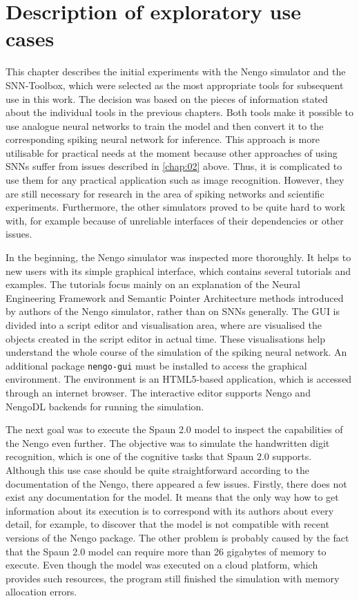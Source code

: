 \chapter{Description of exploratory use cases} \label{chap:05}

This chapter describes the initial experiments with the Nengo simulator and the SNN-Toolbox, which were selected as the most appropriate tools for subsequent use in this work. The decision was based on the pieces of information stated about the individual tools in the previous chapters. Both tools make it possible to use analogue neural networks to train the model and then convert it to the corresponding spiking neural network for inference. This approach is more utilisable for practical needs at the moment because other approaches of using SNNs suffer from issues described in \cref{chap:02} above. Thus, it is complicated to use them for any practical application such as image recognition. However, they are still necessary for research in the area of spiking networks and scientific experiments. Furthermore, the other simulators proved to be quite hard to work with, for example because of unreliable interfaces of their dependencies or other issues. \par
In the beginning, the Nengo simulator was inspected more thoroughly. It helps to new users with its simple graphical interface, which contains several tutorials and examples. The tutorials focus mainly on an explanation of the Neural Engineering Framework and Semantic Pointer Architecture methods introduced by authors of the Nengo simulator, rather than on SNNs generally. The GUI is divided into a script editor and visualisation area, where are visualised the objects created in the script editor in actual time. These visualisations help understand the whole course of the simulation of the spiking neural network. An additional package \texttt{nengo-gui} must be installed to access the graphical environment. The environment is an HTML5-based application, which is accessed through an internet browser. The interactive editor supports Nengo and NengoDL backends for running the simulation. \par
The next goal was to execute the Spaun 2.0 model to inspect the capabilities of the Nengo even further. The objective was to simulate the handwritten digit recognition, which is one of the cognitive tasks that Spaun 2.0 supports. Although this use case should be quite straightforward according to the documentation of the Nengo, there appeared a few issues. Firstly, there does not exist any documentation for the model. It means that the only way how to get information about its execution is to correspond with its authors about every detail, for example, to discover that the model is not compatible with recent versions of the Nengo package. The other problem is probably caused by the fact that the Spaun 2.0 model can require more than 26 gigabytes of memory to execute. Even though the model was executed on a cloud platform, which provides such resources, the program still finished the simulation with memory allocation errors.

